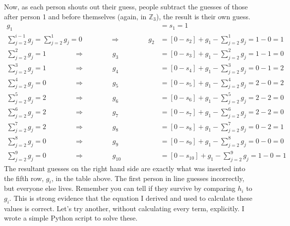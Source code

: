 \documentclass[10pt]{article}
\begin{document}
Now, as each person shouts out their guess, people subtract the guesses 
of those after person 1 and before themselves (again, in $\mathbb{Z}_3$), 
the result is their own guess.
\begin{align*}
    g_1 &= s_1 = 1 \\
    \sum_{j=2}^{i-1}g_j
        =\sum_{j=2}^1g_j=0\qquad\qquad\Rightarrow\qquad\qquad g_2 &=
        [0-s_2]+g_1-\sum_{j=2}^1g_j = 1-0=1 \\
    \sum_{j=2}^2g_j=1\qquad\qquad \Rightarrow\qquad\qquad  g_3 &=
        [0-s_3]+g_1-\sum_{j=2}^2g_j  = 1-1=0 \\
    \sum_{j=2}^3g_j=1\qquad\qquad \Rightarrow\qquad\qquad  g_4 &=
        [0-s_4]+g_1-\sum_{j=2}^3g_j  = 0-1=2 \\
    \sum_{j=2}^4g_j=0\qquad\qquad \Rightarrow\qquad\qquad  g_5 &=
        [0-s_5]+g_1-\sum_{j=2}^4g_j  = 2-0=2 \\
    \sum_{j=2}^5g_j=2\qquad\qquad \Rightarrow\qquad\qquad  g_6 &=
        [0-s_6]+g_1-\sum_{j=2}^5g_j  = 2-2=0 \\
    \sum_{j=2}^6g_j=2\qquad\qquad \Rightarrow\qquad\qquad  g_7 &=
        [0-s_7]+g_1-\sum_{j=2}^6g_j  = 2-2=0 \\
    \sum_{j=2}^7g_j=2\qquad\qquad \Rightarrow\qquad\qquad  g_8 &=
        [0-s_8]+g_1-\sum_{j=2}^7g_j  = 0-2=1 \\
    \sum_{j=2}^8g_j=0\qquad\qquad \Rightarrow\qquad\qquad  g_9 &=
        [0-s_9]+g_1-\sum_{j=2}^8g_j  = 0-0=0 \\
    \sum_{j=2}^9g_j=0\qquad\qquad \Rightarrow\qquad\qquad  g_{10} &=
        [0-s_{10}]+g_1-\sum_{j=2}^9g_j  =1-0=1 
\end{align*}
The resultant guesses on the right hand side are exactly what was 
inserted into the fifth row, $g_i$, in the table above.
The first person in line guesses incorrectly, but everyone else lives. 
Remember you can tell if they survive by comparing $h_i$ to $g_i$.
This is strong evidence that the equation I derived and used to 
calculate these values is correct. Let's try another, without calculating 
every term, explicitly. I wrote a simple Python script to solve these.
\end{document}
